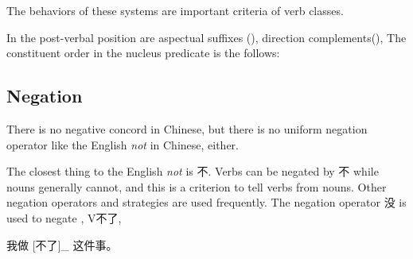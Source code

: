 \documentclass[../main.tex]{subfiles}
\begin{document}
The behaviors of these systems are important criteria of verb classes. %

In the post-verbal position are 
aspectual suffixes (),
direction complements(), %
The constituent order in the nucleus predicate is the follows:
\begin{exe}
    \ex 
\end{exe}

\subsection{Negation}

There is no negative concord in Chinese, 
but there is no uniform negation operator like the English \emph{not} in Chinese, either. 

The closest thing to the English \emph{not} is 不. 
Verbs can be negated by 不 while nouns generally cannot, 
and this is a criterion to tell verbs from nouns. 
Other negation operators and strategies are used frequently.
The negation operator 没 is used to negate , V不了, 

\begin{exe}
    \ex \begin{xlist}
        \ex 我做 [不了]_{} 这件事。
    \end{xlist}    
\end{exe}
\end{document}
